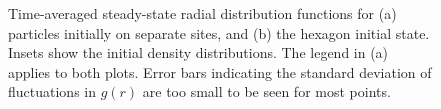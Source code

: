 \begin{figure}[ht]
    \centering

    
    \caption{Time-averaged steady-state radial distribution functions for (a) particles initially on separate sites, and (b) the hexagon initial state. Insets show the initial density distributions. The legend in (a) applies to both plots. Error bars indicating the standard deviation of fluctuations in $g(r)$ are too small to be seen for most points.}
    \label{Fig:RDFs}
\end{figure}
